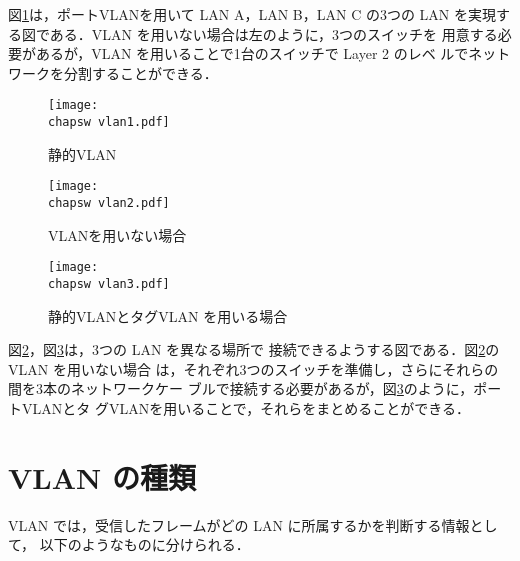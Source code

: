 図\ref{fig:22:static-vlan}は，ポートVLANを用いて LAN A，LAN B，LAN C の3つの
LAN を実現する図である．VLAN を用いない場合は左のように，3つのスイッチを
用意する必要があるが，VLAN を用いることで1台のスイッチで Layer 2 のレベ
ルでネットワークを分割することができる．

\begin{figure}[htb]
  \begin{center}
   \texttt{[image: \\chapsw vlan1.pdf]}
   \caption{静的VLAN}
   \label{fig:22:static-vlan}
  \end{center}
\end{figure}

\begin{figure}[htb]
  \begin{center}
   \texttt{[image: \\chapsw vlan2.pdf]}
   \caption{VLANを用いない場合}
   \label{fig:22:no-vlan}
  \end{center}
\end{figure}

\begin{figure}[htb]
  \begin{center}
   \texttt{[image: \\chapsw vlan3.pdf]}   
   \caption{静的VLANとタグVLAN を用いる場合}
   \label{fig:22:vlan}
  \end{center}
\end{figure}

図\ref{fig:22:no-vlan}，図\ref{fig:22:vlan}は，3つの LAN を異なる場所で
接続できるようする図である．図\ref{fig:22:no-vlan}の VLAN を用いない場合
は，それぞれ3つのスイッチを準備し，さらにそれらの間を3本のネットワークケー
ブルで接続する必要があるが，図\ref{fig:22:vlan}のように，ポートVLANとタ
グVLANを用いることで，それらをまとめることができる．

\section{VLAN の種類}

VLAN では，受信したフレームがどの LAN に所属するかを判断する情報として，
以下のようなものに分けられる．

